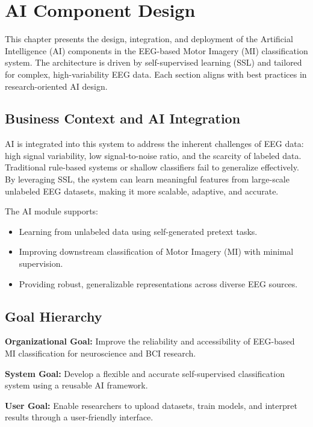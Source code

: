 \chapter{AI Component Design}
\label{ch:ai-component-design}

This chapter presents the design, integration, and deployment of the Artificial Intelligence (AI) components in the EEG-based Motor Imagery (MI) classification system. The architecture is driven by self-supervised learning (SSL) and tailored for complex, high-variability EEG data. Each section aligns with best practices in research-oriented AI design.

\section{Business Context and AI Integration}
\label{sec:business-context}

AI is integrated into this system to address the inherent challenges of EEG data: high signal variability, low signal-to-noise ratio, and the scarcity of labeled data. Traditional rule-based systems or shallow classifiers fail to generalize effectively. By leveraging SSL, the system can learn meaningful features from large-scale unlabeled EEG datasets, making it more scalable, adaptive, and accurate.

The AI module supports:
\begin{itemize}
    \item Learning from unlabeled data using self-generated pretext tasks.
    \item Improving downstream classification of Motor Imagery (MI) with minimal supervision.
    \item Providing robust, generalizable representations across diverse EEG sources.
\end{itemize}

\section{Goal Hierarchy}
\label{sec:goal-hierarchy}

\textbf{Organizational Goal:} Improve the reliability and accessibility of EEG-based MI classification for neuroscience and BCI research.

\textbf{System Goal:} Develop a flexible and accurate self-supervised classification system using a reusable AI framework.

\textbf{User Goal:} Enable researchers to upload datasets, train models, and interpret results through a user-friendly interface.

